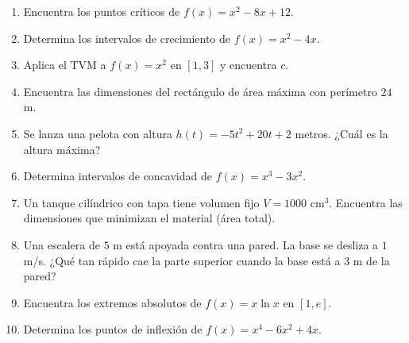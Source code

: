 \documentclass[12pt, a4paper]{article}
\begin{document}
\begin{enumerate}[leftmargin=*, resume]
  \item \facil{} Encuentra los puntos críticos de $f(x) = x^2 - 8x + 12$.

  \item \facil{} Determina los intervalos de crecimiento de $f(x) = x^2 - 4x$.

  \item \facil{} Aplica el TVM a $f(x) = x^2$ en $[1, 3]$ y encuentra $c$.

  \item \medio{} Encuentra las dimensiones del rectángulo de área máxima con perímetro $24$ m.

  \item \medio{} Se lanza una pelota con altura $h(t) = -5t^2 + 20t + 2$ metros. ¿Cuál es la altura máxima?

  \item \medio{} Determina intervalos de concavidad de $f(x) = x^3 - 3x^2$.

  \item \dificil{} Un tanque cilíndrico con tapa tiene volumen fijo $V = 1000$ cm$^3$. Encuentra las dimensiones que minimizan el material (área total).

  \item \dificil{} Una escalera de $5$ m está apoyada contra una pared. La base se desliza a $1$ m/s. ¿Qué tan rápido cae la parte superior cuando la base está a $3$ m de la pared?

  \item \dificil{} Encuentra los extremos absolutos de $f(x) = x \ln x$ en $[1, e]$.

  \item \dificil{} Determina los puntos de inflexión de $f(x) = x^4 - 6x^2 + 4x$.
\end{enumerate}
\end{document}
